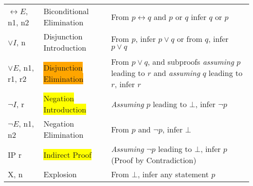 \documentclass{article}
\begin{document}
\begin{definition}
\begin{tabular}{l|lp{8cm}}
        $\leftrightarrow E$, n1, n2 & Biconditional Elimination                     & From $p \leftrightarrow q$ and $p$ or $q$ infer $q$ or $p$                                                              \\
        $\lor I$, n                 & Disjunction Introduction                      & From $p$, infer $p \lor q$ or from $q$, infer $p \lor q$                                                                \\
        $\lor E$, n1, r1, r2        & \colorbox{orange}{Disjunction Elimination}    & From $p \lor q$, and subproofs \textit{assuming} $p$ leading to $r$ and \textit{assuming} $q$ leading to $r$, infer $r$ \\
        $\neg I$, r                 & \colorbox{yellow}{Negation Introduction}      & \textit{Assuming} $p$ leading to $\bot$, infer $\neg p$                                                                 \\
        $\neg E$, n1, n2            & Negation Elimination                          & From $p$ and $\neg p$, infer $\bot$                                                                                     \\
        IP r                        & \colorbox{yellow}{Indirect Proof}             & \textit{Assuming} $\neg p$ leading to $\bot$, infer $p$  (Proof by Contradiction)                                       \\
        X, n                        & Explosion                                     & From $\bot$, infer any statement $p$                                                                                    \\
    \end{tabular}
\end{definition}
\end{document}
